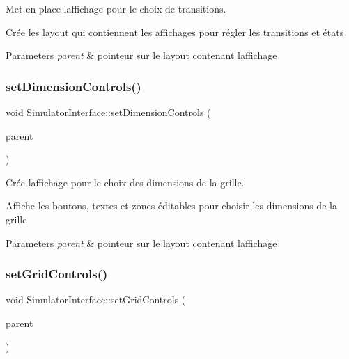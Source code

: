 Met en place l\textquotesingle{}affichage pour le choix de transitions. 

Crée les layout qui contiennent les affichages pour régler les transitions et états 
\begin{DoxyParams}{Parameters}
{\em parent} & pointeur sur le layout contenant l\textquotesingle{}affichage \\
\hline
\end{DoxyParams}
\mbox{\label{class_simulator_interface_ac14b36fcdfda65e0498c629ab9495b0d}} 
\subsubsection{\texorpdfstring{set\+Dimension\+Controls()}{setDimensionControls()}}
{\footnotesize\ttfamily void Simulator\+Interface\+::set\+Dimension\+Controls (\begin{DoxyParamCaption}\item[{Q\+Box\+Layout $\ast$}]{parent }\end{DoxyParamCaption})\hspace{0.3cm}{\ttfamily [protected]}}



Crée l\textquotesingle{}affichage pour le choix des dimensions de la grille. 

Affiche les boutons, textes et zones éditables pour choisir les dimensions de la grille 
\begin{DoxyParams}{Parameters}
{\em parent} & pointeur sur le layout contenant l\textquotesingle{}affichage \\
\hline
\end{DoxyParams}
\mbox{\label{class_simulator_interface_afd8d818dd52b9a64ec474129b356ac7c}} 
\subsubsection{\texorpdfstring{set\+Grid\+Controls()}{setGridControls()}}
{\footnotesize\ttfamily void Simulator\+Interface\+::set\+Grid\+Controls (\begin{DoxyParamCaption}\item[{Q\+Box\+Layout $\ast$}]{parent }\end{DoxyParamCaption})\hspace{0.3cm}{\ttfamily [protected]}}



